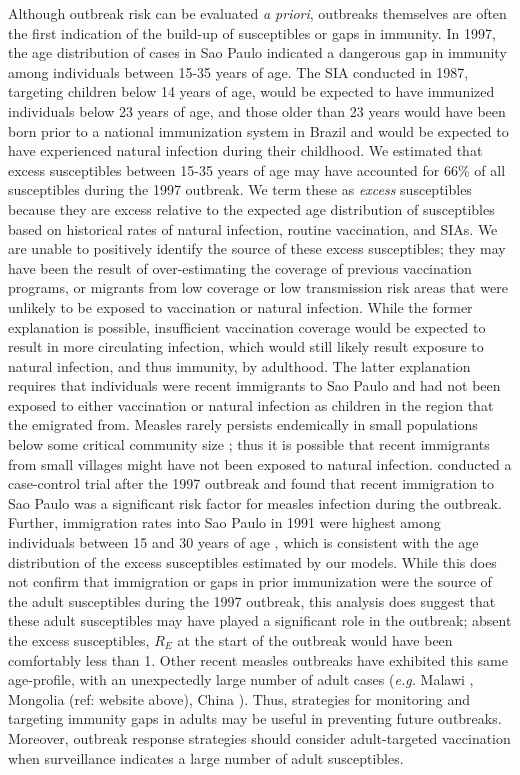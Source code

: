 Although outbreak risk can be evaluated \emph{a priori}, outbreaks themselves are often the first indication of the build-up of susceptibles or gaps in immunity. In 1997, the age distribution of cases in Sao Paulo indicated a dangerous gap in immunity among individuals between 15-35 years of
age. The SIA conducted in 1987, targeting children below 14 years of age, would be expected to have immunized individuals below 23 years of
age, and those older than 23 years would have been born prior to a national immunization system in Brazil and would be expected
to have experienced natural infection during their childhood. We estimated that excess susceptibles between 15-35 years of age may have accounted for 66\% of all susceptibles during the 1997 outbreak. We term these as \emph{excess} susceptibles because they are
excess relative to the expected age distribution of susceptibles based on historical rates of natural infection, routine vaccination, and SIAs. We are unable to positively identify the source of these excess susceptibles; they may have been the result of over-estimating the coverage of previous
vaccination programs, or migrants from low coverage or low transmission risk areas that were unlikely to be exposed to vaccination or natural infection. While the former explanation is possible, insufficient vaccination coverage would be expected to result in more circulating infection, which would still likely result exposure to natural infection, and thus immunity, by adulthood. The latter explanation requires that individuals were recent immigrants to Sao Paulo and had not been exposed to either vaccination or natural infection as children in the region that the emigrated from. Measles rarely persists endemically in small populations below some critical community size \cite{Conlan_2007, Keeling_1997}; thus it is possible that recent immigrants from small villages might have not been exposed to natural infection. \citet{Camargo_2000} conducted a case-control trial after the 1997 outbreak and found that recent immigration to Sao Paulo was a significant risk factor for measles infection during the outbreak. Further, immigration rates into Sao Paulo in 1991 were highest among individuals between 15 and 30 years of age  \cite{de_Moraes_2016}, which is consistent with the age distribution of the excess susceptibles estimated by our models. While this does not confirm that
immigration or gaps in prior immunization were the source of the adult susceptibles during the 1997 outbreak, this analysis does suggest that
these adult susceptibles may have played a significant role in the outbreak; absent the excess susceptibles, $R_E$ at the start of the outbreak would have been comfortably less than 1. Other recent measles outbreaks have exhibited this same age-profile, with an unexpectedly large number of adult cases (\emph{e.g.} Malawi \cite{Minetti_2013}, Mongolia (ref: website above), China \cite{Zheng_2015}). Thus, strategies for monitoring and targeting immunity gaps in adults may be useful in preventing future outbreaks. Moreover, outbreak response strategies should consider adult-targeted vaccination when surveillance indicates a large number of adult susceptibles.


